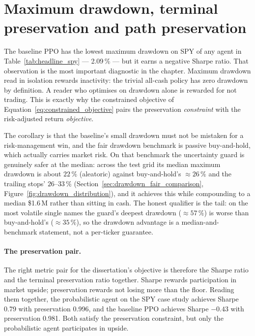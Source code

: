 \section{Maximum drawdown, terminal preservation and path preservation}
\label{sec:mdd_versus_preservation}

The baseline PPO has the lowest maximum drawdown on SPY of any agent in Table~\ref{tab:headline_spy} --- 2.09\,\% --- but it earns a negative Sharpe ratio. That observation is the most important diagnostic in the chapter. Maximum drawdown read in isolation rewards inactivity: the trivial all-cash policy has zero drawdown by definition. A reader who optimises on drawdown alone is rewarded for not trading. This is exactly why the constrained objective of Equation~\ref{eq:constrained_objective} pairs the preservation \emph{constraint} with the risk-adjusted return \emph{objective}.

The corollary is that the baseline's small drawdown must not be mistaken for a risk-management win, and the fair drawdown benchmark is passive buy-and-hold, which actually carries market risk. On that benchmark the uncertainty guard is genuinely safer at the median: across the test grid its median maximum drawdown is about $22\,\%$ (aleatoric) against buy-and-hold's $\approx 26\,\%$ and the trailing stops' $26$--$33\,\%$ (Section~\ref{sec:drawdown_fair_comparison}, Figure~\ref{fig:drawdown_distribution}), and it achieves this while compounding to a median \$1.6\,M rather than sitting in cash. The honest qualifier is the tail: on the most volatile single names the guard's deepest drawdown ($\approx 57\,\%$) is worse than buy-and-hold's ($\approx 35\,\%$), so the drawdown advantage is a median-and-benchmark statement, not a per-ticker guarantee.

\paragraph{The preservation pair.} The right metric pair for the dissertation's objective is therefore the Sharpe ratio and the terminal preservation ratio together. Sharpe rewards participation in market upside; preservation rewards not losing more than the floor. Reading them together, the probabilistic agent on the SPY case study achieves Sharpe 0.79 with preservation 0.996, and the baseline PPO achieves Sharpe $-0.43$ with preservation 0.981. Both satisfy the preservation constraint, but only the probabilistic agent participates in upside.


